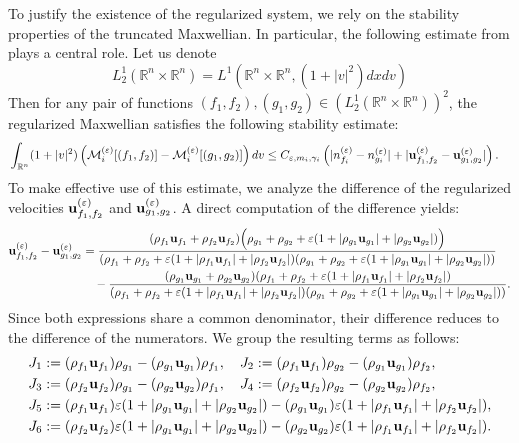 \documentclass[10pt,reqno]{amsart}
\numberwithin{equation}{section}
\newcommand{\R}{\mathbb R}
\newcommand{\lt}{\left}
\newcommand{\rt}{\right}
\newcommand{\calM}{\mathcal M}
\newcommand{\ve}{\varepsilon}
\begin{document}
To justify the existence of the regularized system, we rely on the stability properties of the truncated Maxwellian. In particular, the following estimate from \cite[Lemma 1.9]{KS24} plays a central role. Let us denote
\[
L^1_2(\R^n \times \R^n) = L^1(\R^n \times \R^n,(1+|v|^2)dxdv)
\]
Then for any pair of functions $(f_1, f_2), (g_1, g_2) \in (L^1_2(\R^n \times \R^n))^2$, the regularized Maxwellian satisfies the following stability estimate:
\begin{equation}\label{eq: stab1}
\begin{split}
    &\int_{\R^n} (1+|v|^2)\lt(\calM^{(\ve)}_i[(f_1,f_2)] - \calM^{(\ve)}_i[(g_1,g_2)] \rt) dv  \le C_{\ve,m_i,\gamma_i} \left(|n_{f_i}^{(\ve)} - n_{g_i}^{(\ve)}| + |{\bf{u}}_{f_1,f_2}^{(\ve)} - {\bf{u}}_{g_1,g_2}^{(\ve)}| \right).
    \end{split}
\end{equation}
To make effective use of this estimate, we analyze the difference of the regularized velocities ${\bf{u}}_{f_1,f_2}^{(\ve)}$ and ${\bf{u}}_{g_1,g_2}^{(\ve)}$. A direct computation of the difference yields:
\begin{align*}
   {\bf{u}}_{f_1,f_2}^{(\ve)} - {\bf{u}}_{g_1,g_2}^{(\ve)} 
    &= \frac{(\rho_{f_1}{\bf{u}}_{f_1} + \rho_{f_2}{\bf{u}}_{f_2})\Big(\rho_{g_1} + \rho_{g_2}+\ve(1+|\rho_{g_1}{\bf{u}}_{g_1}| + |\rho_{g_2}{\bf{u}}_{g_2}|)\Big)}{(\rho_{f_1}+\rho_{f_2} + \ve(1+|\rho_{f_1}{\bf{u}}_{f_1}| + |\rho_{f_2}{\bf{u}}_{f_2}|) (\rho_{g_1}+\rho_{g_2}+\ve(1+|\rho_{g_1}{\bf{u}}_{g_1}| + |\rho_{g_2}{\bf{u}}_{g_2}|))} \\
    &\quad - \frac{(\rho_{g_1}{\bf{u}}_{g_1} + \rho_{g_2}{\bf{u}}_{g_2})(\rho_{f_1}+\rho_{f_2} + \ve(1+|\rho_{f_1}{\bf{u}}_{f_1}| + |\rho_{f_2}{\bf{u}}_{f_2}|)}{(\rho_{f_1}+\rho_{f_2} + \ve(1+|\rho_{f_1}{\bf{u}}_{f_1}| + |\rho_{f_2}{\bf{u}}_{f_2}|) (\rho_{g_1}+\rho_{g_2}+\ve(1+|\rho_{g_1}{\bf{u}}_{g_1}| + |\rho_{g_2}{\bf{u}}_{g_2}|))}.
\end{align*}
Since both expressions share a common denominator, their difference reduces to the difference of the numerators. We group the resulting terms as follows:
\begin{align*}
    &J_1 := (\rho_{f_1} {\bf{u}}_{f_1}) \rho_{g_1} - (\rho_{g_1} {\bf{u}}_{g_1}) \rho_{f_1}, \quad J_2 := (\rho_{f_1} {\bf{u}}_{f_1}) \rho_{g_2} - (\rho_{g_1} {\bf{u}}_{g_1}) \rho_{f_2},\\
    &J_3 := (\rho_{f_2}{\bf{u}}_{f_2}) \rho_{g_1} - (\rho_{g_2}{\bf{u}}_{g_2} )\rho_{f_1}, \quad J_4 := (\rho_{f_2}{\bf{u}}_{f_2})\rho_{g_2} - (\rho_{g_2}{\bf{u}}_{g_2})\rho_{f_2},\\
    &J_5 := (\rho_{f_1}{\bf{u}}_{f_1})\ve(1+|\rho_{g_1}{\bf{u}}_{g_1}|+|\rho_{g_2}{\bf{u}}_{g_2}|)  - (\rho_{g_1}{\bf{u}}_{g_1})\ve(1+|\rho_{f_1}{\bf{u}}_{f_1}|+|\rho_{f_2}{\bf{u}}_{f_2}|) ,\\
    &J_6 := (\rho_{f_2}{\bf{u}}_{f_2})\ve(1+|\rho_{g_1}{\bf{u}}_{g_1}|+|\rho_{g_2}{\bf{u}}_{g_2}|) - (\rho_{g_2}{\bf{u}}_{g_2})\ve(1+|\rho_{f_1}{\bf{u}}_{f_1}|+|\rho_{f_2}{\bf{u}}_{f_2}|) .
\end{align*}
\end{document}
